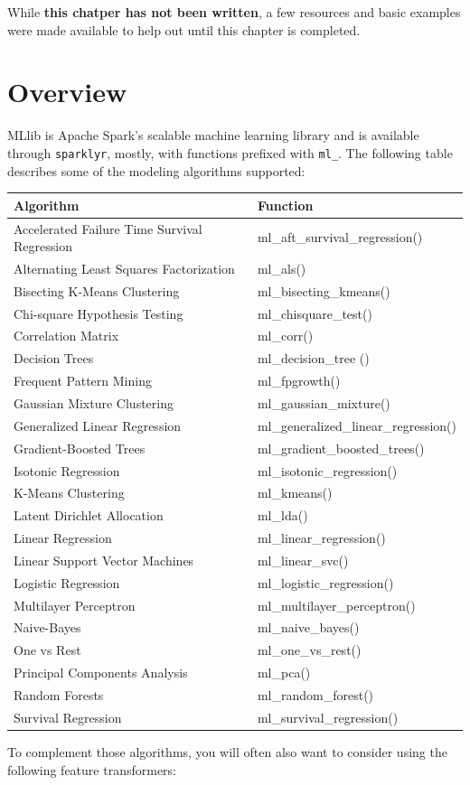 \documentclass[]{book}
\theoremstyle{definition}
\theoremstyle{definition}
\theoremstyle{definition}
\theoremstyle{remark}
\begin{document}
While \textbf{this chatper has not been written}, a few resources and
basic examples were made available to help out until this chapter is
completed.

\hypertarget{overview}{%
\section{Overview}\label{overview}}

MLlib is Apache Spark's scalable machine learning library and is
available through \texttt{sparklyr}, mostly, with functions prefixed
with \texttt{ml\_}. The following table describes some of the modeling
algorithms supported:

\begin{longtable}[]{@{}ll@{}}
\toprule
Algorithm & Function\tabularnewline
\midrule
\endhead
Accelerated Failure Time Survival Regression &
ml\_aft\_survival\_regression()\tabularnewline
Alternating Least Squares Factorization & ml\_als()\tabularnewline
Bisecting K-Means Clustering & ml\_bisecting\_kmeans()\tabularnewline
Chi-square Hypothesis Testing & ml\_chisquare\_test()\tabularnewline
Correlation Matrix & ml\_corr()\tabularnewline
Decision Trees & ml\_decision\_tree ()\tabularnewline
Frequent Pattern Mining & ml\_fpgrowth()\tabularnewline
Gaussian Mixture Clustering & ml\_gaussian\_mixture()\tabularnewline
Generalized Linear Regression &
ml\_generalized\_linear\_regression()\tabularnewline
Gradient-Boosted Trees & ml\_gradient\_boosted\_trees()\tabularnewline
Isotonic Regression & ml\_isotonic\_regression()\tabularnewline
K-Means Clustering & ml\_kmeans()\tabularnewline
Latent Dirichlet Allocation & ml\_lda()\tabularnewline
Linear Regression & ml\_linear\_regression()\tabularnewline
Linear Support Vector Machines & ml\_linear\_svc()\tabularnewline
Logistic Regression & ml\_logistic\_regression()\tabularnewline
Multilayer Perceptron & ml\_multilayer\_perceptron()\tabularnewline
Naive-Bayes & ml\_naive\_bayes()\tabularnewline
One vs Rest & ml\_one\_vs\_rest()\tabularnewline
Principal Components Analysis & ml\_pca()\tabularnewline
Random Forests & ml\_random\_forest()\tabularnewline
Survival Regression & ml\_survival\_regression()\tabularnewline
\bottomrule
\end{longtable}

To complement those algorithms, you will often also want to consider
using the following feature transformers:
\end{document}
